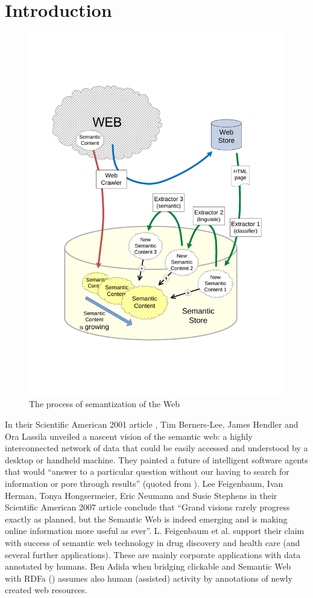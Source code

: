 \documentclass{www2009-submission}
\begin{document}


\section{Introduction}

\begin{figure}[b!]
\centering
\includegraphics[height=.8\hsize, width=\hsize]{img/Semantization}
\caption{The process of semantization of the Web}
\label{img:Semantization}
\end{figure}

In their Scientific American 2001 article \cite{biblio:2001-Berners-Lee-SemanticWeb}, Tim Berners-Lee, James Hendler and Ora Lassila unveiled a nascent vision of the semantic web: a highly interconnected network of data that could be easily accessed and understood by a desktop or handheld machine. They painted a future of intelligent software agents that would ``answer to a particular question without our having to search for information or pore through results'' (quoted from \cite{biblio:feigenbaum_semantic_2007}). Lee Feigenbaum, Ivan Herman, Tonya Hongsermeier, Eric Neumann and Susie Stephens in their Scientific American 2007 article \cite{biblio:feigenbaum_semantic_2007} conclude that ``Grand visions rarely progress exactly as planned, but the Semantic Web is indeed emerging and is making online information more useful as ever''. L. Feigenbaum et al. support their claim with success of semantic web technology in drug discovery and health care (and several further applications). These are mainly corporate applications with data annotated by humans. Ben Adida when bridging clickable and Semantic Web with RDFa (\cite{biblio:AdidaClickable}) assumes also human (assisted) activity by annotations of newly created web resources. \par
\end{document}
